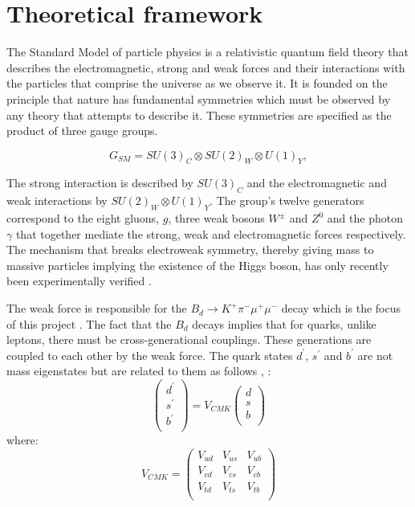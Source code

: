 \documentclass[a4paper,12pt]{article}
\begin{document}
\section{Theoretical framework}

The Standard Model of particle physics  \cite{paper22,paper23,paper24,paper25,paper26,paper27,paper28,paper29,paper30} is a relativistic quantum field theory that describes the electromagnetic, strong and weak forces and their interactions with the particles that comprise the universe as we observe it. It is founded on the principle that nature has fundamental symmetries which must be observed by any theory that attempts to describe it. 
These symmetries are specified as the product of three gauge groups. 

\begin{equation}\label{SM}
G_{SM} = SU(3)_C \otimes SU(2)_W \otimes U(1)_Y,
\end{equation}

The strong interaction is described by $SU(3)_C$ and the electromagnetic and weak interactions by $SU(2)_W \otimes U(1)_Y$. The group's twelve generators correspond to the eight gluons, $g$, three weak bosons $W^\pm$ and $Z^0$ and the photon $\gamma$ that together mediate the strong, weak and electromagnetic forces respectively\cite[p. 13]{paper1}. 
The mechanism that breaks electroweak symmetry, thereby giving mass to massive particles implying the existence of the Higgs boson, has only recently been experimentally verified \cite{paper33}. 

The weak force is responsible for the $B_d  \rightarrow K^+  \pi^-\mu^+\mu^-$ decay which is the focus of this project \cite[p. 21]{paper1}. 
The fact that the $B_d$ decays implies that for quarks, unlike leptons,  there must be cross-generational couplings. These generations are coupled to each other by the weak force. The quark states $d^{\prime}$, $s^{\prime}$ and $b^{\prime}$ are not mass eigenstates but are related to them as follows \cite[p. 414]{riazuddin}, \cite{paper29, paper30}: 
\begin{equation}
\begin{pmatrix} d^{\prime} \\ 
                         s^{\prime}\\
                         b^{\prime}\\
\end{pmatrix}
= V_{CMK}  \begin{pmatrix} d \\ 
                         s\\
                         b\\
\end{pmatrix}
\end{equation}
where: 
\begin{equation}
V_{CMK} = \begin{pmatrix} V_{ud}& V_{us}& V_{ub}\\
                                           V_{cd} &V_{cs} &V_{cb} \\
V_{td} &V_{ts}& V_{tb} \\
\end{pmatrix}
\end{equation}
\end{document}
